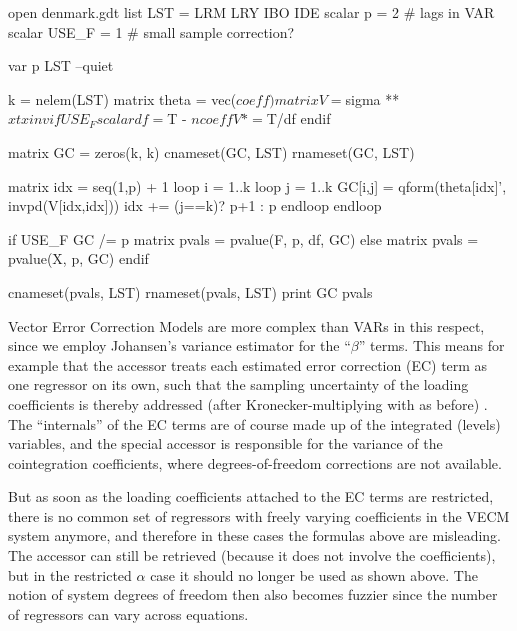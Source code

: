 \begin{script}[htbp]
\begin{scode}
open denmark.gdt
list LST = LRM LRY IBO IDE
scalar p = 2 # lags in VAR
scalar USE_F = 1 # small sample correction?

var p LST --quiet

k = nelem(LST)
matrix theta = vec($coeff)
matrix V = $sigma ** $xtxinv
if USE_F
  scalar df = $T - $ncoeff
  V *= $T/df
endif

matrix GC = zeros(k, k)
cnameset(GC, LST)
rnameset(GC, LST)

matrix idx = seq(1,p) + 1
loop i = 1..k
  loop j = 1..k
    GC[i,j] = qform(theta[idx]', invpd(V[idx,idx]))
    idx += (j==k)? p+1 : p
  endloop
endloop

if USE_F
  GC /= p
  matrix pvals = pvalue(F, p, df, GC)
else
  matrix pvals = pvalue(X, p, GC)
endif

cnameset(pvals, LST)
rnameset(pvals, LST)
print GC pvals
\end{scode}
\end{script}

Vector Error Correction Models are more complex than VARs in this
respect, since we employ Johansen's variance estimator for the
``$\beta$'' terms.
This means for example that the  accessor treats each estimated
error correction (EC) term as one regressor on its own, such that the sampling uncertainty
of the loading coefficients is thereby addressed (after Kronecker-multiplying with
 as before) . The ``internals'' of the EC terms
are of course made up of the integrated (levels) variables, and the special
 accessor is responsible for the variance of the cointegration coefficients,
where degrees-of-freedom corrections are not available.

But as soon as the loading coefficients attached to the EC terms are restricted, there is
no common set of regressors with freely varying coefficients in the VECM system anymore,
and therefore in these cases the formulas above are misleading. The 
accessor can still be retrieved (because it does not involve the coefficients), but in
the restricted $\alpha$ case it should no longer be used as shown above.
The notion of system degrees of freedom then also becomes fuzzier since the number of
regressors can vary across equations.

